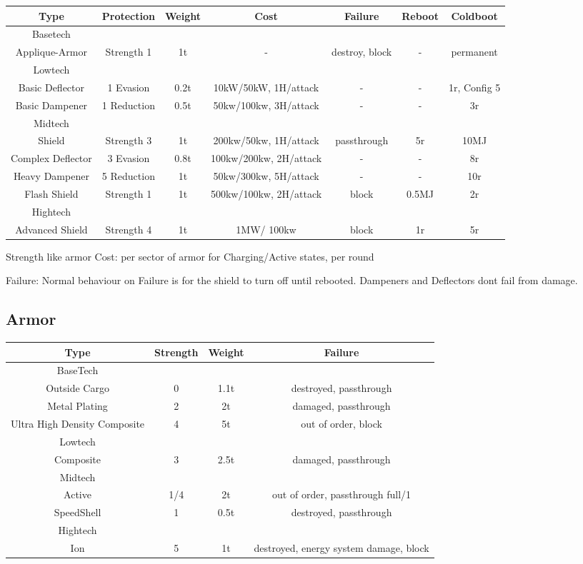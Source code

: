 \begin{tabular}{c|cccccc}
    Type & Protection &Weight& Cost & Failure  & Reboot & Coldboot \\
    \hline Basetech\\
    Applique-Armor & Strength 1 & 1t & - & destroy, block & - & permanent \\
    \hline Lowtech\\
    Basic Deflector & 1 Evasion & 0.2t & 10kW/50kW, 1H/attack & - & - & 1r, Config 5\\
    Basic Dampener & 1 Reduction & 0.5t & 50kw/100kw, 3H/attack & - & - & 3r \\
    \hline Midtech\\
    Shield & Strength 3 & 1t & 200kw/50kw, 1H/attack & passthrough & 5r & 10MJ \\
    Complex Deflector & 3 Evasion & 0.8t & 100kw/200kw, 2H/attack & - & - & 8r\\
    Heavy Dampener & 5 Reduction & 1t & 50kw/300kw, 5H/attack & - & - & 10r\\
    Flash Shield & Strength 1 & 1t & 500kw/100kw, 2H/attack & block & 0.5MJ & 2r\\
    \hline Hightech\\
    Advanced Shield & Strength 4 & 1t & 1MW/ 100kw & block & 1r & 5r 
\end{tabular}

Strength like armor
Cost:  per sector of armor for Charging/Active states, per round\par
Failure: Normal behaviour on Failure is for the shield to turn off until rebooted.
Dampeners and Deflectors dont fail from damage.

\subsection{Armor}\label{subsec:armor}
\begin{tabular}{c|ccc}
    Type & Strength & Weight & Failure\\
    \hline BaseTech&&&\\
    Outside Cargo & 0 & 1.1t & destroyed, passthrough\\
    Metal Plating & 2 & 2t & damaged, passthrough\\
    Ultra High Density Composite & 4 & 5t & out of order, block\\
    \hline Lowtech &&&\\
    Composite & 3 & 2.5t & damaged, passthrough \\
    \hline Midtech &&&\\
    Active & 1/4 & 2t & out of order, passthrough full/1\\
    SpeedShell & 1 & 0.5t & destroyed, passthrough \\
    \hline Hightech &&&\\
    Ion & 5 & 1t & destroyed, energy system damage, block 
\end{tabular}

